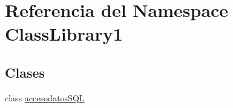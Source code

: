 \hypertarget{namespace_class_library1}{}\section{Referencia del Namespace Class\+Library1}
\label{namespace_class_library1}
\subsection*{Clases}
\begin{DoxyCompactItemize}
\item 
class \mbox{\hyperlink{class_class_library1_1_1accesodatos_s_q_l}{accesodatos\+S\+QL}}
\end{DoxyCompactItemize}

